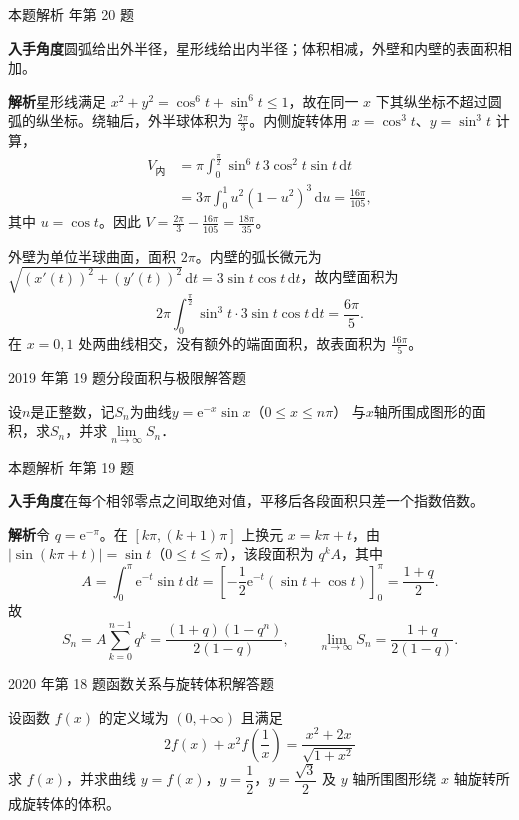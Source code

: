 \documentclass[UTF8,zihao=-4,fontset=fandol]{ctexart}
\renewcommand{\lim}{\operatorname*{lim}\limits}
\newcommand{\QuestionPage}[6]{%
  \par\noindent\begin{minipage}{\linewidth}
  \raggedright
  {\small\textcolor{black!60}{#3\quad #5}\hfill\textcolor{accent}{#2}}\par\smallskip}
\newcommand{\QuestionEnd}{\end{minipage}\par\medskip}
\newcommand{\QuestionPage}[6]{%
  \clearpage
  {\small\textcolor{accent}{#1\hfill #2}}\par\medskip
  {\small\textcolor{black!60}{#3\quad #5\hfill #6}}\par\vspace{9bp}}
\newcommand{\QuestionEnd}{}
\newenvironment{QuestionSolution}[1]{%
  \clearpage
  {\small\textcolor{black!60}{本题解析\quad #1}}\par\medskip
}{\par\clearpage}
\begin{document}
\begin{QuestionSolution}{2016 年第 20 题}
\textbf{入手角度}\quad 圆弧给出外半径，星形线给出内半径；体积相减，外壁和内壁的表面积相加。

\textbf{解析}\quad 星形线满足 \(x^2+y^2=\cos^6t+\sin^6t\le1\)，故在同一 \(x\) 下其纵坐标不超过圆弧的纵坐标。绕轴后，外半球体积为 \(\frac{2\pi}{3}\)。内侧旋转体用 \(x=\cos^3t\)、\(y=\sin^3t\) 计算，
\[
\begin{aligned}
V_{\text{内}}
&=\pi\int_0^{\frac{\pi}{2}}\sin^6 t\,3\cos^2t\sin t\,\mathrm{d}t\\
&=3\pi\int_0^1 u^2(1-u^2)^3\,\mathrm{d}u
=\frac{16\pi}{105},
\end{aligned}
\]
其中 \(u=\cos t\)。因此 \(V=\frac{2\pi}{3}-\frac{16\pi}{105}=\boxed{\frac{18\pi}{35}}\)。

外壁为单位半球曲面，面积 \(2\pi\)。内壁的弧长微元为
\(\sqrt{(x'(t))^2+(y'(t))^2}\,\mathrm{d}t=3\sin t\cos t\,\mathrm{d}t\)，故内壁面积为
\[
2\pi\int_0^{\frac{\pi}{2}}\sin^3t\cdot3\sin t\cos t\,\mathrm{d}t
=\frac{6\pi}{5}.
\]
在 \(x=0,1\) 处两曲线相交，没有额外的端面面积，故表面积为 \(\boxed{\frac{16\pi}{5}}\)。
\end{QuestionSolution}

\QuestionPage{3.4 定积分的应用}{解答题}{2019 年第 19 题}{3}{分段面积与极限}{183 / 234}
设$n$是正整数，记$S_n$为曲线$y = \mathrm{e}^{- x}\sin x$（$0 \le x \le n\pi$）
与$x$轴所围成图形的面积，求$S_n$，并求$\lim_{n \to \infty} S_n$．
\QuestionEnd

\begin{QuestionSolution}{2019 年第 19 题}
\textbf{入手角度}\quad 在每个相邻零点之间取绝对值，平移后各段面积只差一个指数倍数。

\textbf{解析}\quad 令 \(q=\mathrm{e}^{-\pi}\)。在 \([k\pi,(k+1)\pi]\) 上换元 \(x=k\pi+t\)，由 \(|\sin(k\pi+t)|=\sin t\)（\(0\le t\le\pi\)），该段面积为 \(q^kA\)，其中
\[
A=\int_0^\pi \mathrm{e}^{-t}\sin t\,\mathrm{d}t
=\left[-\frac12 \mathrm{e}^{-t}(\sin t+\cos t)\right]_0^\pi
=\frac{1+q}{2}.
\]
故
\[
S_n=A\sum_{k=0}^{n-1}q^k
=\boxed{\frac{(1+q)(1-q^n)}{2(1-q)}},
\qquad
\lim_{n\to\infty}S_n=\boxed{\frac{1+q}{2(1-q)}}.
\]
\end{QuestionSolution}

\QuestionPage{3.4 定积分的应用}{解答题}{2020 年第 18 题}{3}{函数关系与旋转体积}{184 / 234}
设函数 \(f\left( x \right)\) 的定义域为 \(\left( 0,+\infty \right)\) 且满足
\[2f\left( x \right)+x^{2}f\left( \dfrac{1}{x} \right)=\dfrac{x^{2}+2x}{\sqrt{1+x^{2}}}
\]
求 \(f\left( x \right)\)，并求曲线 \(y=f\left( x \right)\)，\(y=\dfrac{1}{2}\)，\(y=\dfrac{\sqrt{3}}{2}\) 及 \(y\) 轴所围图形绕 \(x\) 轴旋转所成旋转体的体积。
\QuestionEnd
\end{document}
